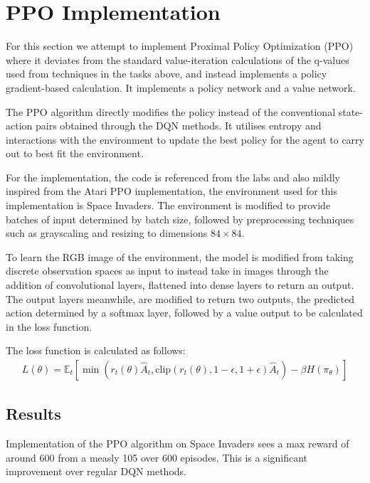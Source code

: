 \renewcommand{\thesection}{Extra Task}
\section{PPO Implementation}

For this section we attempt to implement Proximal Policy Optimization (PPO) where it deviates from the standard value-iteration calculations of the q-values used from techniques in the tasks above, and instead implements a policy gradient-based calculation. It implements a policy network and a value network. 

The PPO algorithm directly modifies the policy instead of the conventional state-action pairs obtained through the DQN methods. It utilises entropy and interactions with the environment to update the best policy for the agent to carry out to best fit the environment.

For the implementation, the code is referenced from the labs and also mildly inspired from the Atari PPO implementation\cite{ppo_github}, the environment used for this implementation is Space Invaders. The environment is modified to provide batches of input determined by batch size, followed by preprocessing techniques such as grayscaling and resizing to dimensions $84 \times 84$.

To learn the RGB image of the environment, the model is modified from taking discrete observation spaces as input to instead take in images through the addition of convolutional layers, flattened into dense layers to return an output. The output layers meanwhile, are modified to return two outputs, the predicted action determined by a softmax layer, followed by a value output to be calculated in the loss function.

The loss function is calculated as follows:
\begin{align*}
   L(\theta) = \mathbb{E}_t \left[ \min \left( r_t(\theta) \hat{A}_t, \text{clip}(r_t(\theta), 1 - \epsilon, 1 + \epsilon) \hat{A}_t \right) - \beta H(\pi_{\theta}) \right] 
\end{align*}

\subsection{Results}
Implementation of the PPO algorithm on Space Invaders sees a max reward of around 600 from a measly 105 over 600 episodes. This is a significant improvement over regular DQN methods.
